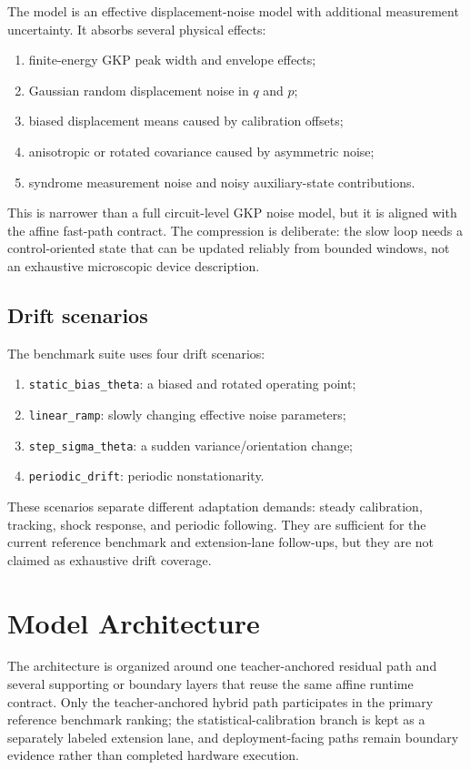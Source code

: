\documentclass[11pt]{article}
\begin{document}
The model is an effective displacement-noise model with additional measurement
uncertainty.  It absorbs several physical effects:
\begin{enumerate}
    \item finite-energy GKP peak width and envelope effects;
    \item Gaussian random displacement noise in \(q\) and \(p\);
    \item biased displacement means caused by calibration offsets;
    \item anisotropic or rotated covariance caused by asymmetric noise;
    \item syndrome measurement noise and noisy auxiliary-state contributions.
\end{enumerate}
This is narrower than a full circuit-level GKP noise model, but it is aligned
with the affine fast-path contract.  The compression is deliberate: the slow
loop needs a control-oriented state that can be updated reliably from bounded
windows, not an exhaustive microscopic device description.

\subsection{Drift scenarios}

The benchmark suite uses four drift scenarios:
\begin{enumerate}
    \item \texttt{static\_bias\_theta}: a biased and rotated operating point;
    \item \texttt{linear\_ramp}: slowly changing effective noise parameters;
    \item \texttt{step\_sigma\_theta}: a sudden variance/orientation change;
    \item \texttt{periodic\_drift}: periodic nonstationarity.
\end{enumerate}
These scenarios separate different adaptation demands: steady calibration,
tracking, shock response, and periodic following.  They are sufficient for the
current reference benchmark and extension-lane follow-ups, but they are not
claimed as exhaustive drift coverage.

\section{Model Architecture}

The architecture is organized around one teacher-anchored residual
path and several supporting or boundary layers that reuse the same affine
runtime contract.  Only the teacher-anchored hybrid path participates in the
primary reference benchmark ranking; the statistical-calibration branch is kept
as a separately labeled extension lane, and deployment-facing paths remain
boundary evidence rather than completed hardware execution.
\end{document}

